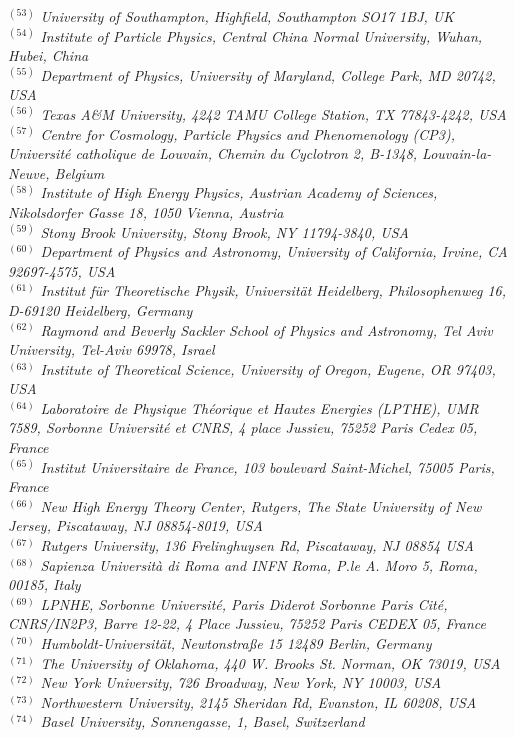 {\begin{center}
$^{(53)}$ \emph{University of Southampton, Highfield, Southampton SO17 1BJ, UK}\\
$^{(54)}$ \emph{Institute of Particle Physics, Central China Normal University, Wuhan, Hubei, China}\\
$^{(55)}$ \emph{Department of Physics, University of Maryland, College Park, MD  20742,  USA}\\
$^{(56)}$ \emph{Texas A\&M University, 4242 TAMU College Station, TX 77843-4242, USA}\\
$^{(57)}$ \emph{Centre for Cosmology, Particle Physics and Phenomenology (CP3), Universit\'e catholique de Louvain, Chemin du Cyclotron 2, B-1348, Louvain-la-Neuve, Belgium}\\
$^{(58)}$ \emph{Institute of High Energy Physics, Austrian Academy of Sciences, Nikolsdorfer Gasse 18, 1050 Vienna, Austria}\\
$^{(59)}$ \emph{Stony Brook University, Stony Brook, NY 11794-3840, USA}\\
$^{(60)}$ \emph{Department of Physics and Astronomy, University of California, Irvine, CA 92697-4575, USA}\\
$^{(61)}$ \emph{Institut  f\"ur Theoretische Physik, Universit\"at Heidelberg, Philosophenweg 16, D-69120 Heidelberg, Germany}\\
$^{(62)}$ \emph{Raymond and Beverly Sackler School of Physics and Astronomy, Tel Aviv University, Tel-Aviv 69978, Israel}\\
$^{(63)}$ \emph{Institute of Theoretical Science, University of Oregon, Eugene, OR 97403, USA}\\
$^{(64)}$ \emph{Laboratoire de Physique Th\'eorique et Hautes Energies (LPTHE), UMR 7589, Sorbonne Universit\'e et CNRS, 4 place Jussieu, 75252 Paris Cedex 05, France}\\
$^{(65)}$ \emph{Institut Universitaire de France, 103 boulevard Saint-Michel, 75005 Paris, France}\\
$^{(66)}$ \emph{New High Energy Theory Center, Rutgers, The State University of New Jersey, Piscataway, NJ 08854-8019, USA}\\
$^{(67)}$ \emph{Rutgers University, 136 Frelinghuysen Rd, Piscataway, NJ 08854 USA}\\
$^{(68)}$ \emph{Sapienza Universit\`a di Roma and INFN Roma, P.le A. Moro 5, Roma, 00185, Italy}\\
$^{(69)}$ \emph{LPNHE, Sorbonne Universit{\'e}, Paris Diderot Sorbonne Paris Cit{\'e}, CNRS/IN2P3, Barre 12-22, 4 Place Jussieu, 75252 Paris CEDEX 05, France}\\
$^{(70)}$ \emph{Humboldt-Universit\"at, Newtonstra\ss e 15 12489 Berlin, Germany}\\
$^{(71)}$ \emph{The University of Oklahoma, 440 W. Brooks St. Norman, OK 73019, USA}\\
$^{(72)}$ \emph{New York University, 726 Broadway, New York, NY 10003, USA}\\
$^{(73)}$ \emph{Northwestern University, 2145 Sheridan Rd, Evanston, IL 60208, USA}\\
$^{(74)}$ \emph{Basel University, Sonnengasse, 1, Basel, Switzerland}\\


\end{center}}